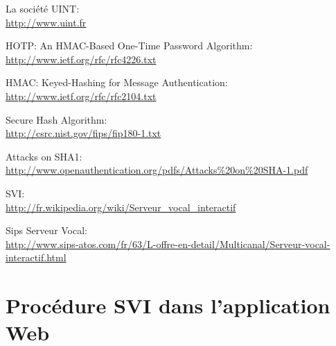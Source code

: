 \documentclass[a4paper,french,12pt]{report}
\begin{document}
\begin{thebibliography}{9}	


                La société UINT:\\
		\url{http://www.uint.fr}

                HOTP: An HMAC-Based One-Time Password Algorithm:\\
		\url{http://www.ietf.org/rfc/rfc4226.txt}

                HMAC: Keyed-Hashing for Message Authentication:\\
		\url{http://www.ietf.org/rfc/rfc2104.txt}

                Secure Hash Algorithm:\\
		\url{http://csrc.nist.gov/fips/fip180-1.txt}

                Attacks on SHA1:\\
		\url{http://www.openauthentication.org/pdfs/Attacks\%20on\%20SHA-1.pdf}

                SVI:\\
		\url{http://fr.wikipedia.org/wiki/Serveur_vocal_interactif}

                Sips Serveur Vocal:\\
		\url{http://www.sips-atos.com/fr/63/L-offre-en-detail/Multicanal/Serveur-vocal-interactif.html}


\end{thebibliography}

\appendix

\chapter{Procédure SVI dans l'application Web}
\label{svi}
\begin{center}
        
\end{center}



\end{document}

